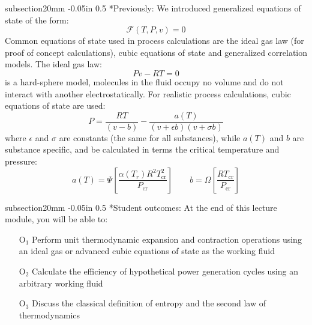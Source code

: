 \documentclass[11pt]{article}
\makeatletter
\theoremstyle{definition}
\renewcommand\subsection{\@startsection
	{subsection}{2}{0mm}
	{-0.05in}
	{0.5\baselineskip}
	{\normalfont\normalsize\bfseries}}
\makeatother
\begin{document}
\begin{mdframed}[backgroundcolor=lgray]
\subsection*{Previously:}
\noindent We introduced generalized equations of state of the form:
\begin{equation}
	\mathcal{F}\left(T,P,v\right) = 0
\end{equation}
Common equations of state used in process calculations are the ideal gas law (for proof of concept calculations), cubic equations of state and generalized correlation models. The ideal gas law:
\begin{equation}
	Pv - RT = 0
\end{equation}is a hard-sphere model, molecules in the fluid occupy no volume and do not interact with another electrostatically.
For realistic process calculations, cubic equations of state are used:
\begin{equation}
	P = \frac{RT}{\left(v-b\right)}-\frac{a(T)}{\left(v+\epsilon b\right)\left(v+\sigma b\right)}
\end{equation}where $\epsilon$ and $\sigma$ are constants (the same for all substances), while
$a(T)$ and $b$ are substance specific, and be calculated in terms the critical temperature and pressure:
\begin{equation}
	a\left(T\right) = \Psi\left[\frac{\alpha\left(T_{r}\right)R^{2}T^{2}_{\mathrm{cr}}}{P_{\mathrm{cr}}}\right]\qquad
	b = \Omega\left[\frac{RT_{\mathrm{cr}}}{P_{\mathrm{cr}}}\right]
\end{equation}

\subsection*{Student outcomes:}
At the end of this lecture module, you will be able to:
\begin{itemize}
	\item[O$_1$]{Perform unit thermodynamic expansion and contraction operations using an ideal gas or advanced cubic equations of state as the working fluid}
	\item[O$_2$]{Calculate the efficiency of hypothetical power generation cycles using an arbitrary working fluid}
	\item[O$_3$]{Discuss the classical definition of entropy and the second law of thermodynamics}
\end{itemize}

\end{mdframed}
\end{document}
